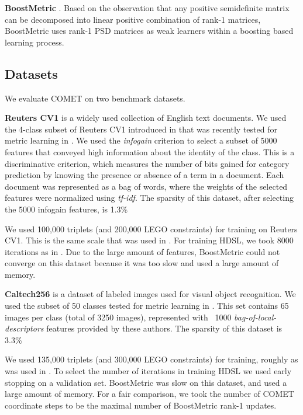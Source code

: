 \documentclass{article}
\begin{document}
\textbf{BoostMetric} \cite{boost}. Based on the observation that any positive semidefinite matrix can be decomposed into linear positive combination of rank-1 matrices, BoostMetric uses rank-1 PSD matrices as weak learners within a boosting based learning process.


\subsection{Datasets}
We evaluate COMET on two benchmark datasets.

\textbf{Reuters CV1} is a widely used collection of English text documents. We used the 4-class subset of Reuters CV1 introduced in \cite{CaiRCV14} that was recently tested for metric learning in \cite{hdsl}. We used the \textit{infogain} criterion \cite{infogain} to select a subset of 5000 features that conveyed high information about the identity of the class. This is a discriminative criterion, which measures the number of bits gained for category prediction by knowing the presence or absence of a term in a document. Each document was represented as a bag of words, where the weights of the selected features were normalized using \textit{tf-idf}. The sparsity of this dataset, after selecting the 5000 infogain features, is 1.3\%

We used 100,000 triplets (and 200,000 LEGO constraints) for training on Reuters CV1. This is the same scale that was used in \cite{hdsl}. For training HDSL, we took 8000 iterations as in \cite{hdsl}. Due to the large amount of features, BoostMetric could not converge on this dataset because it was too slow and used a large amount of memory.

\textbf{Caltech256} is a dataset of labeled images used for visual object recognition. We used the subset of 50 classes tested for metric learning in \cite{OASIS}. This set contains 65 images per class (total of 3250 images), represented with ~1000 \textit{bag-of-local-descriptors} features provided by these authors. The sparsity of this dataset is 3.3\%

We used 135,000 triplets (and 300,000 LEGO constraints) for training, roughly as was used in \cite{OASIS}. To select the number of iterations in training HDSL we used early stopping on a validation set. BoostMetric was slow on this dataset, and used a large amount of memory. For a fair comparison, we took the number of COMET coordinate steps to be the maximal number of BoostMetric rank-1 updates.
\end{document}
